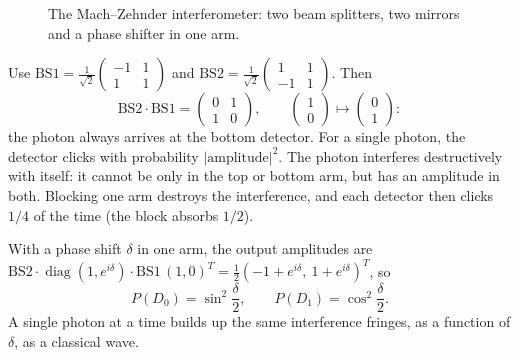 \begin{figure}[ht]
\centering
{}
\caption{The Mach--Zehnder interferometer: two beam splitters, two mirrors and a phase shifter in one arm.}
\end{figure}

\begin{example}
Use $\mathrm{BS1} = \frac{1}{\sqrt2}\begin{pmatrix}-1&1\\1&1\end{pmatrix}$ and $\mathrm{BS2} = \frac{1}{\sqrt2}\begin{pmatrix}1&1\\-1&1\end{pmatrix}$. Then
\[
    \mathrm{BS2}\cdot\mathrm{BS1} = \begin{pmatrix}0&1\\1&0\end{pmatrix},
    \qquad
    \begin{pmatrix}1\\0\end{pmatrix}\mapsto\begin{pmatrix}0\\1\end{pmatrix}:
\]
the photon always arrives at the bottom detector. For a single photon, the detector clicks with probability $|\text{amplitude}|^2$. The photon interferes destructively with itself: it cannot be only in the top or bottom arm, but has an amplitude in both. Blocking one arm destroys the interference, and each detector then clicks $1/4$ of the time (the block absorbs $1/2$).

With a phase shift $\delta$ in one arm, the output amplitudes are $\mathrm{BS2}\cdot\operatorname{diag}(1,e^{i\delta})\cdot\mathrm{BS1}\,(1,0)^T = \frac12(-1+e^{i\delta},\ 1+e^{i\delta})^T$, so
\[
    P(D_0) = \sin^2\frac\delta2,
    \qquad
    P(D_1) = \cos^2\frac\delta2 .
\]
A single photon at a time builds up the same interference fringes, as a function of $\delta$, as a classical wave.
\end{example}

